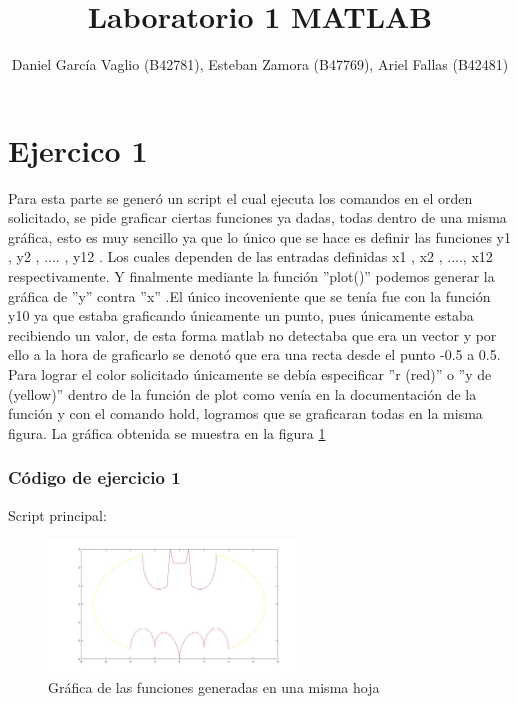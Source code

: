 \documentclass[12pt,letterpaper]{article}
\begin{document}
\title{Laboratorio 1 MATLAB}
\author{Daniel García Vaglio (B42781), Esteban Zamora (B47769), Ariel Fallas (B42481)}
\maketitle

\section{Ejercico 1}


Para esta parte se generó un script el cual ejecuta los comandos en el orden solicitado, se pide graficar ciertas funciones ya dadas, todas dentro de una misma gráfica, esto es muy sencillo ya que lo único que se hace es definir las funciones y1 , y2 , .... , y12 . Los cuales dependen de las entradas definidas x1 , x2 , ...., x12 respectivamente. Y finalmente mediante la función ''plot()'' podemos generar la gráfica de ''y'' contra ''x'' .El único incoveniente que se tenía fue con la función y10 ya que estaba graficando únicamente un punto, pues únicamente estaba recibiendo un valor, de esta forma matlab no detectaba que era un vector y por ello a la hora de graficarlo se denotó que era una recta desde el punto -0.5 a 0.5. 
Para lograr el color solicitado únicamente se debía especificar ''r (red)'' o ''y de (yellow)'' dentro de la función de plot como venía en la documentación de la función y con el comando hold, logramos que se graficaran todas en la misma figura. La gráfica obtenida se muestra en la figura \ref{fig:batman}

\subsubsection{Código de ejercicio 1}


Script principal:



\begin{figure}[ht!]
	\centering
	\includegraphics[width=0.6\textwidth]{pictures/Ejercicio1/batman_function.jpg}
	\caption{Gráfica de las funciones generadas en una misma hoja}
	\label{fig:batman}
\end{figure} 
\end{document}
